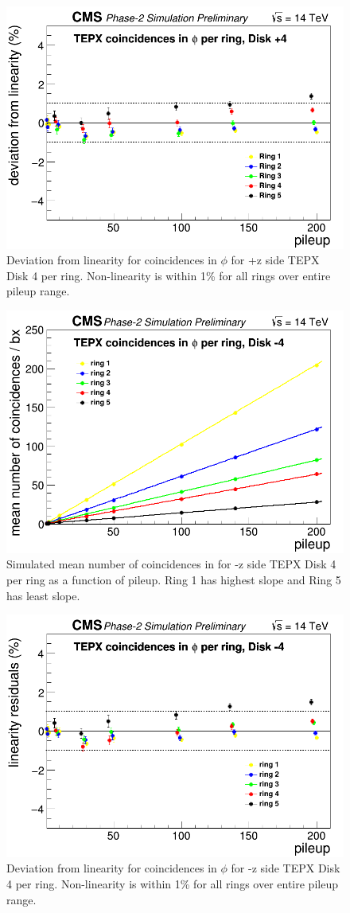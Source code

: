 \begin{figure}[H]
  \centering
  \includegraphics[width=0.5\columnwidth]{./TEPX_coincidences_in_phi_per_ring_mean_number_of_coincidences___bxDisk4_Linearity_residuals.png}
  \caption{Deviation from linearity for coincidences in $\phi$ for +z side TEPX Disk 4 per ring. Non-linearity is within 1\% for all rings over entire pileup range.}
  \label{fig:CMS}
\end{figure}



\begin{figure}[H]
  \centering
  \includegraphics[width=0.5\columnwidth]{./TEPX_coincidences_inphi_per_ring__Disk_-4_Linearity.png}
  \caption{Simulated mean number of coincidences in \phi for -z side TEPX Disk 4 per ring as a function of pileup. Ring 1 has highest slope and Ring 5 has least slope.}
  \label{fig:CMS}
\end{figure}


\begin{figure}[H]
  \centering
  \includegraphics[width=0.5\columnwidth]{./TEPX_coincidences_inphi_per_ring__Disk_-4_Linearity_residuals.png}
  \caption{Deviation from linearity for coincidences in $\phi$ for -z side TEPX Disk 4 per ring. Non-linearity is within 1\% for all rings over entire pileup range.}
  \label{fig:CMS}
\end{figure}



